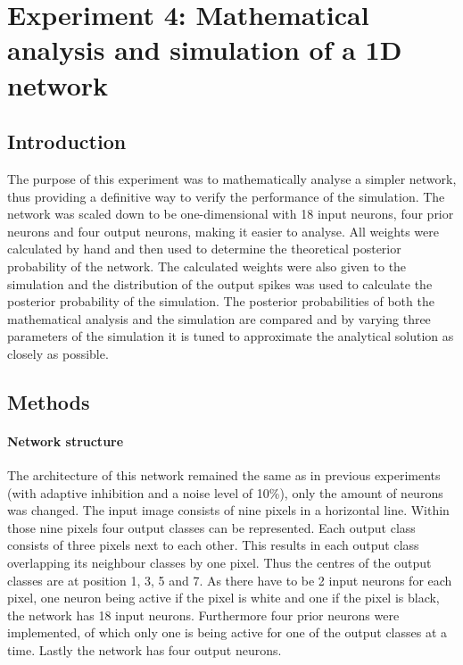 \section{Experiment 4: Mathematical analysis and simulation of a 1D network}
\label{section:1D}

\subsection{Introduction}

The purpose of this experiment was to mathematically analyse a simpler network, thus providing a definitive way to verify the performance of the simulation. The network was scaled down to be one-dimensional with 18 input neurons, four prior neurons and four output neurons, making it easier to analyse. All weights were calculated by hand and then used to determine the theoretical posterior probability of the network. The calculated weights were also given to the simulation and the distribution of the output spikes was used to calculate the posterior probability of the simulation. The posterior probabilities of both the mathematical analysis and the simulation are compared and by varying three parameters of the simulation it is tuned to approximate the analytical solution as closely as possible.

\subsection{Methods}

\paragraph{Network structure}
The architecture of this network remained the same as in previous experiments (with adaptive inhibition and a noise level of 10\%), only the amount of neurons was changed. The input image consists of nine pixels in a horizontal line. Within those nine pixels four output classes can be represented. Each output class consists of three pixels next to each other. This results in each output class overlapping its neighbour classes by one pixel. Thus the centres of the output classes are at position 1, 3, 5 and 7.    As there have to be 2 input neurons for each pixel, one neuron being active if the pixel is white and one if the pixel is black, the network has 18 input neurons. Furthermore four prior neurons were implemented, of which only one is being active for one of the output classes at a time. Lastly the network has four output neurons.

